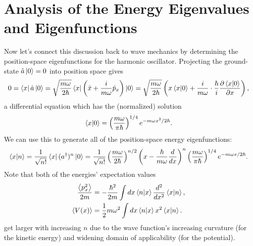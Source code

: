 \documentclass[../p116main.tex]{subfiles}
\begin{document}
\section{Analysis of the Energy Eigenvalues and Eigenfunctions}
Now let's connect this discussion back to wave mechanics by determining the position-space eigenfunctions for the harmonic oscillator.
Projecting the ground-state $\hat a \left| 0 \right> = 0$ into position space gives
\[ 0 = \left< x \right| \hat a \left| 0 \right> = \sqrt{\frac{m\omega}{2\hbar}} \left< x \right| \left( \hat x + \frac{i}{m\omega} \hat p_x \right) \left| 0 \right> = \sqrt{\frac{m\omega}{2\hbar}} \left( x \left< x \middle| 0 \right> + \frac{i}{m\omega} \cdot \frac{\hbar}{i} \frac{\partial \left< x \middle| 0 \right>}{\partial x} \right), \]
a differential equation which has the (normalized) solution
\[ \left< x \middle| 0 \right> = \left( \frac{m\omega}{\pi \hbar} \right)^{1 / 4} e^{-m\omega x^2 / 2\hbar}. \]
We can use this to generate all of the position-space energy eigenfunctions:
\[ \left< x \middle| n \right> = \frac{1}{\sqrt{n!}} \left< x \right| (a^\dagger)^n \left| 0 \right> = \frac{1}{\sqrt{n!}} \left( \frac{m\omega}{2\hbar} \right)^{n / 2} \left( x - \frac{\hbar}{m\omega} \frac{d}{dx} \right)^{n} \left( \frac{m\omega}{\pi \hbar} \right)^{1 / 4} e^{-m\omega x / 2\hbar}. \]
Note that both of the energies' expectation values
\begin{align*}
    \frac{\left< p_x^2 \right>}{2m} &= -\frac{\hbar^2}{2m} \int dx \left< n \middle| x \right> \frac{d^2}{dx^2} \left< x \middle| n \right>, \\
    \left< V(x) \right> &= \frac{1}{2} m\omega^2 \int dx \left< n \middle| x \right> x^2 \left< x \middle| n \right>.
\end{align*}
get larger with increasing $n$ due to the wave function's increasing curvature (for the kinetic energy) and widening domain of applicability (for the potential).
\end{document}
